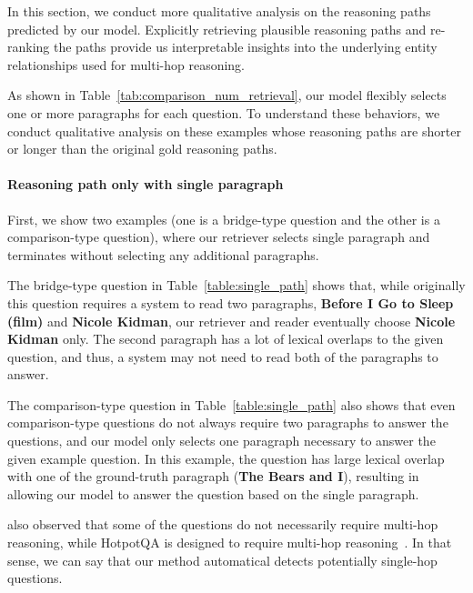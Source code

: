 \documentclass{article} \usepackage{iclr2020_conference,times}
\begin{document}
In this section, we conduct more qualitative analysis on the reasoning paths predicted by our model. 
Explicitly retrieving plausible reasoning paths and re-ranking the paths provide us interpretable insights into the underlying entity relationships used for multi-hop reasoning.

As shown in Table~\ref{tab:comparison_num_retrieval}, our model flexibly selects one or more paragraphs for each question. 
To understand these behaviors, we conduct qualitative analysis on these examples whose reasoning paths are shorter or longer than the original gold reasoning paths. 

\paragraph{Reasoning path only with single paragraph}
First, we show two examples (one is a bridge-type question and the other is a comparison-type question), where our retriever selects single paragraph and terminates without selecting any additional paragraphs.

The bridge-type question in Table~\ref{table:single_path} shows that, while originally this question requires a system to read two paragraphs, {\bf Before I Go to Sleep (film)} and {\bf Nicole Kidman}, our retriever and reader eventually choose {\bf Nicole Kidman} only.
The second paragraph has a lot of lexical overlaps to the given question, and thus, a system may not need to read both of the paragraphs to answer.

The comparison-type question in Table~\ref{table:single_path} also shows that even comparison-type questions do not always require two paragraphs to answer the questions, and our model only selects one paragraph necessary to answer the given example question.
In this example, the question has large lexical overlap with one of the ground-truth paragraph ({\bf The Bears and I}), resulting in allowing our model to answer the question based on the single paragraph.

\cite{min2019compositional} also observed that some of the questions do not necessarily require multi-hop reasoning, while HotpotQA is designed to require multi-hop reasoning~\citep{yang-etal-2018-hotpotqa}.
In that sense, we can say that our method automatical detects potentially single-hop questions.
\end{document}
